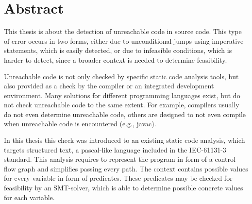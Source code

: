 \chapter{Abstract}
\label{cha:abstract}


This thesis is about the detection of unreachable code in source code. This type of error occurs in two forms, either due to unconditional jumps using imperative statements, which is easily detected, or due to infeasible conditions, which is harder to detect, since a broader context is needed to determine feasibility.


Unreachable code is not only checked by specific static code analysis tools,  but also provided as a check by the compiler or an integrated development environment. Many solutions for different programming languages exist, but do not check unreachable code to the same extent. For example, compilers usually do not even determine unreachable code, others are designed to not even compile when unreachable code is encountered (e.g., javac).


In this thesis this check was introduced to an existing static code analysis, which targets structured text, a pascal-like language included in the IEC-61131-3 standard. This analysis requires to represent the program in form of a control flow graph and simplifies passing every path. The context contains possible values for every variable in form of predicates. These predicates may be checked for feasibility by an SMT-solver, which is able to determine possible concrete values for each variable. 